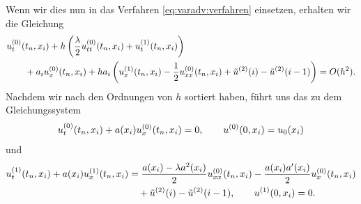 Wenn wir dies nun in das Verfahren \eqref{eq:varadv:verfahren} einsetzen, erhalten wir die Gleichung
\begin{align*}
&u^{(0)}_t (t_n, x_i) + h \left( \frac \lambda 2 u^{(0)}_{tt}(t_n, x_i) + u^{(1)}_t(t_n, x_i) \right)\\ 
&\qquad +  a_i u^{(0)}_x(t_n, x_i) + h a_i \left( u^{(1)}_x(t_n, x_i) - \frac 12 u^{(0)}_{xx}(t_n, x_i) + \tilde u^{(2)}(i) - \tilde u^{(2)}(i-1) \right) = O(h^2).
\end{align*}
Nachdem wir nach den Ordnungen von $h$ sortiert haben, führt uns das zu dem Gleichungssystem
\begin{align*}
u^{(0)}_t(t_n, x_i) + a(x_i) u^{(0)}_x(t_n, x_i) = 0, \qquad u^{(0)}(0, x_i) = u_0(x_i)
\end{align*}
und 
\begin{align*}
u^{(1)}_t(t_n, x_i) + a(x_i) u^{(1)}_x(t_n, x_i) &= \frac {a(x_i) - \lambda a^2(x_i)}{2} u^{(0)}_{xx}(t_n,x_i) - \frac{a(x_i) a'(x_i)}{2} u^{(0)}_x(t_n,x_i)\\
                                         & \quad + \tilde u^{(2)}(i) - \tilde u^{(2)}(i-1), \qquad u^{(1)}(0, x_i) = 0.
\end{align*}